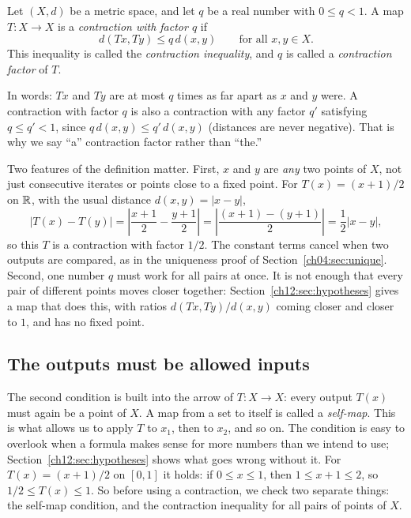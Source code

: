 \par\noindent\begin{minipage}{\linewidth}
\begin{definition}[Contraction]\label{ch12:def:contraction}
Let $(X,d)$ be a metric space, and let $q$ be a real number with $0\le q<1$. A map $T:X\to X$ is a \emph{contraction with factor $q$} if
\[
d(Tx,Ty)\le q\,d(x,y)\qquad\text{for all }x,y\in X.
\]
This inequality is called the \emph{contraction inequality}, and $q$ is called a \emph{contraction factor} of $T$.
\end{definition}
\end{minipage}\par

In words: $Tx$ and $Ty$ are at most $q$ times as far apart as $x$ and $y$ were. A contraction with factor $q$ is also a contraction with any factor $q'$ satisfying $q\le q'<1$, since $q\,d(x,y)\le q'\,d(x,y)$ (distances are never negative). That is why we say ``a'' contraction factor rather than ``the.''

Two features of the definition matter. First, $x$ and $y$ are \emph{any} two points of $X$, not just consecutive iterates or points close to a fixed point. For $T(x)=(x+1)/2$ on $\mathbb R$, with the usual distance $d(x,y)=|x-y|$,
\[
|T(x)-T(y)|=\left|\frac{x+1}{2}-\frac{y+1}{2}\right|
=\left|\frac{(x+1)-(y+1)}{2}\right|
=\frac12|x-y|,
\]
so this $T$ is a contraction with factor $1/2$. The constant terms cancel when two outputs are compared, as in the uniqueness proof of Section~\ref{ch04:sec:unique}. Second, one number $q$ must work for all pairs at once. It is not enough that every pair of different points moves closer together: Section~\ref{ch12:sec:hypotheses} gives a map that does this, with ratios $d(Tx,Ty)/d(x,y)$ coming closer and closer to $1$, and has no fixed point.

\subsection*{The outputs must be allowed inputs}
The second condition is built into the arrow of $T:X\to X$: every output $T(x)$ must again be a point of $X$. A map from a set to itself is called a \emph{self-map}. This is what allows us to apply $T$ to $x_1$, then to $x_2$, and so on. The condition is easy to overlook when a formula makes sense for more numbers than we intend to use; Section~\ref{ch12:sec:hypotheses} shows what goes wrong without it. For $T(x)=(x+1)/2$ on $[0,1]$ it holds: if $0\le x\le1$, then $1\le x+1\le2$, so $1/2\le T(x)\le1$. So before using a contraction, we check two separate things: the self-map condition, and the contraction inequality for all pairs of points of $X$.

